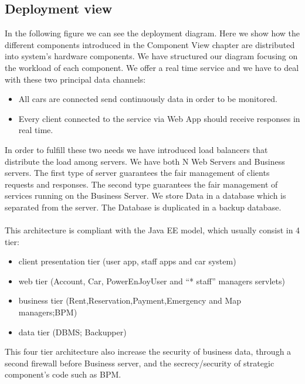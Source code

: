 \documentclass[english]{article}
\begin{document}
	
	\subsection{Deployment view}
	In the following figure we can see the deployment diagram. Here we show how the different components introduced in the Component View chapter are distributed into system's hardware components.
We have structured our diagram focusing on the workload of each component. We offer a real time service and we have to deal with these two principal data channels:
	\begin{itemize}
		\item All cars are connected send continuously data in order to be monitored. 
		\item Every client connected to the service via Web App should receive responses in real time.
	\end {itemize}
In order to fulfill these two needs we have introduced load balancers that distribute the load among servers. 
We have both N Web Servers and Business servers. The first type of server guarantees the fair management of clients requests and responses. The second type guarantees the fair management of services running on the Business Server.
We store Data in a database which is separated from the server. The Database is duplicated in a backup database.\\\\
This architecture is compliant with the Java EE model, which usually consist in 4 tier: 
		\begin{itemize}
			\item{ client presentation tier (user app, staff apps and car system)}
			\item{ web tier (Account, Car, PowerEnJoyUser and  ``* staff'' managers servlets)}
			\item{ business tier (Rent,Reservation,Payment,Emergency and Map managers;BPM)}
			\item{ data tier (DBMS; Backupper) }
		\end{itemize}
		This four tier architecture also increase the security of business data, through a second firewall before Business server, and the secrecy/security of strategic component's code such as BPM.
		
\end{document}
